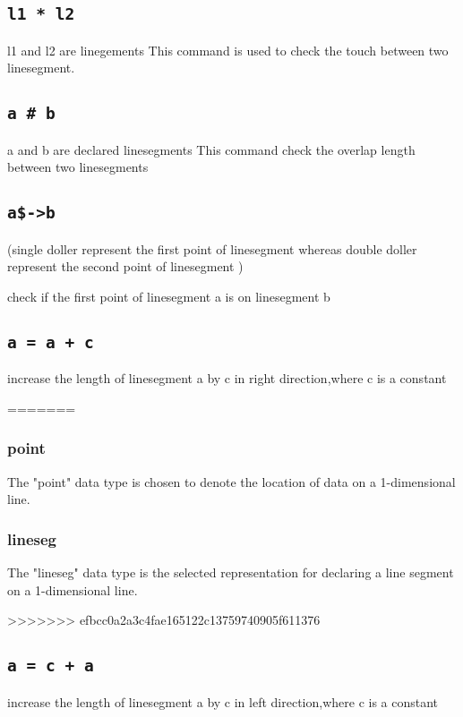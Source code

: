 \documentclass{article}
\begin{document}
\subsection{\texttt{l1 * l2}}
l1 and l2 are linegements
This command is used to check the touch between two linesegment.
\subsection{\texttt{a \# b}}
a and b are declared linesegments
This command check the overlap length between two linesegments

\subsection{\texttt{a\$->b}}
(single doller represent the first point of linesegment whereas double doller represent the second point of linesegment )

check if the first point of linesegment a is on linesegment b
\subsection{\texttt{a = a + c }}
increase the length of linesegment a by c in right direction,where c is a constant


=======

\subsubsection{point}
\begin{description}[leftmargin=1cm]
  \item[Usage:] The "point" data type is chosen to denote the location of data on a 1-dimensional line.
\end{description}

\subsubsection{lineseg}
\begin{description}[leftmargin=1cm]
  \item[Usage:] The "lineseg" data type is the selected representation for declaring a line segment on a 1-dimensional line.
\end{description}
>>>>>>> efbcc0a2a3c4fae165122c13759740905f611376
\subsection{\texttt{a = c + a}}
increase the length of linesegment a by c in left direction,where c is a constant
\end{document}
